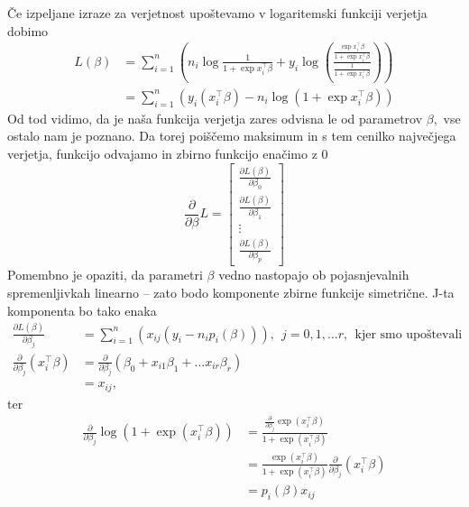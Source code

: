 \documentclass[12pt,a4paper]{amsart}
\theoremstyle{definition} %
\theoremstyle{plain} %
\begin{document}
Če izpeljane izraze za verjetnost upoštevamo v logaritemski funkciji verjetja dobimo
\begin{align}
    L(\beta) &= \sum_{i=1}^{n}\left( n_{i}\log{\frac{1}{1 + \exp{x_{i}^\top\beta}}}  + y_{i}\log{\left( \frac{\frac{\exp{x_{i}^{\top} \beta}}{1 + \exp{x_{i}^\top\beta}}}{\frac{1}{1 + \exp{x_{i}^\top\beta}}}  \right)} \right) \nonumber\\
                &= \sum_{i=1}^{n}\left( y_{i}(x_{i}^\top\beta) - n_{i}\log(1 + \exp{x_{i}^\top\beta})           \right)
\end{align}
Od tod vidimo, da je naša funkcija verjetja zares odvisna le od parametrov $\beta$,~vse ostalo nam je poznano. Da torej poiščemo maksimum in s tem
cenilko največjega verjetja, funkcijo odvajamo in zbirno funkcijo enačimo z 0
\[
    \frac{\partial}{\partial \beta} L = \begin{bmatrix}
                                 \frac{\partial L(\beta)}{\partial \beta_{0}} \\
                                 \frac{\partial L(\beta)}{\partial \beta_{1}} \\
                                 \vdots \\
                                 \frac{\partial L(\beta)}{\partial \beta_{p}}
                        \end{bmatrix}
\]
Pomembno je opaziti, da parametri $\beta$ vedno nastopajo ob pojasnjevalnih spremenljivkah linearno -- zato bodo komponente zbirne funkcije simetrične.
J-ta komponenta bo tako enaka
\begin{align}
    \frac{\partial L(\beta)}{\partial \beta_{j}} &= \sum_{i=1}^{n} \left(x_{ij}(y_{i} - n_{i}p_{i}(\beta))   \right),~~j = 0,1,\ldots r,~~\text{kjer~smo~upoštevali} \\
    \frac{\partial}{\partial \beta_{j}}(x_{i}^\top\beta) &= \frac{\partial}{\partial \beta_{j}}\left(\beta_{0} + x_{i1}\beta_{1} + \ldots x_{ir}\beta_{r}\right) \nonumber\\
                                                    &= x_{ij},
\end{align}
ter
\begin{align}                                         
    \frac{\partial}{\partial \beta_{j}} \log(1 + \exp(x_{i}^\top\beta)) &= \frac{ \frac{\partial}{\partial \beta_{j}}\exp(x_{i}^\top\beta) }{1 + \exp(x_{i}^\top\beta)} \nonumber \\
    &= \frac{\exp(x_{i}^\top\beta)}{1 + \exp(x_{i}^\top\beta)} \frac{\partial}{\partial \beta_{j}} (x_{i}^\top\beta) \nonumber \\
    &=p_{i}(\beta)x_{ij}
\end{align}
\end{document}
